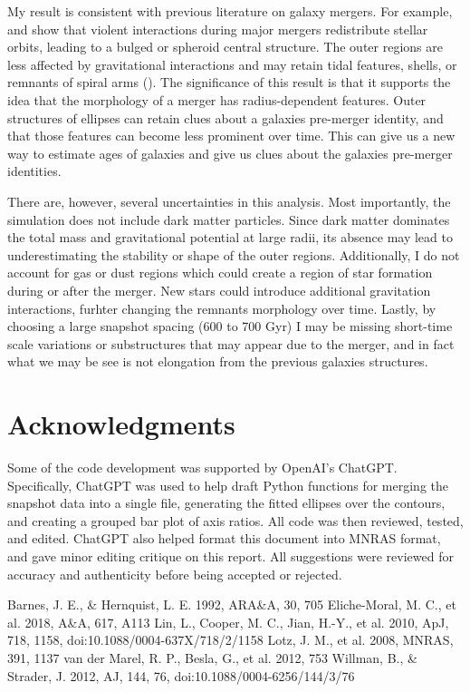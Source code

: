 \documentclass[usenatbib]{mnras}
\begin{document}
My result is consistent with previous literature on galaxy mergers. For example, \citet{Barnes1992} and \citet{Hopkins2008} show that violent interactions during major mergers redistribute stellar orbits, leading to a bulged or spheroid central structure. The outer regions are less affected by gravitational interactions and may retain tidal features, shells, or remnants of spiral arms (\citealt{Duc2013}). The significance of this result is that it supports the idea that the morphology of a merger has radius-dependent features. Outer structures of ellipses can retain clues about a galaxies pre-merger identity, and that those features can become less prominent over time. This can give us a new way to estimate ages of galaxies and give us clues about the galaxies pre-merger identities. 


There are, however, several uncertainties in this analysis. Most importantly, the simulation does not include dark matter particles. Since dark matter dominates the total mass and gravitational potential at large radii, its absence may lead to underestimating the stability or shape of the outer regions. Additionally, I do not account for gas or dust regions which could create a region of star formation during or after the merger. New stars could introduce additional gravitation interactions, furhter changing the remnants morphology over time. Lastly, by choosing a large snapshot spacing (600 to 700 Gyr) I may be missing short-time scale variations or substructures that may appear due to the merger, and in fact what we may be see is not elongation from the previous galaxies structures. 

\section*{Acknowledgments}
Some of the code development was supported by OpenAI’s ChatGPT. Specifically, ChatGPT was used to help draft Python functions for merging the snapshot data into a single file, generating the fitted ellipses over the contours, and creating a grouped bar plot of axis ratios. All code was then reviewed, tested, and edited.
ChatGPT also helped format this document into MNRAS format, and gave minor editing critique on this report. All suggestions were reviewed for accuracy and authenticity before being accepted or rejected. 



\begin{thebibliography}{}
 Barnes, J. E., \& Hernquist, L. E. 1992, ARA\&A, 30, 705
 Eliche-Moral, M. C., et al. 2018, A\&A, 617, A113
 Lin, L., Cooper, M. C., Jian, H.-Y., et al. 2010, ApJ, 718, 1158, doi:10.1088/0004-637X/718/2/1158
 Lotz, J. M., et al. 2008, MNRAS, 391, 1137
 van der Marel, R. P., Besla, G., et al. 2012, 753
Willman, B., \& Strader, J. 2012, AJ, 144, 76, doi:10.1088/0004-6256/144/3/76
\end{thebibliography}

 
\end{document}
